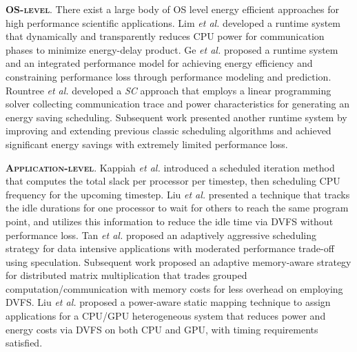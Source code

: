 \documentclass[12pt]{elsarticle}
\begin{document}
\vspace{1mm}
\noindent\textsc{\textbf{OS-level}}. There exist a large body of OS level energy efficient approaches for high performance scientific applications. Lim \textit{et al.} \cite{sc06} developed a runtime system that dynamically and transparently reduces CPU power for communication phases to minimize energy-delay product. Ge \textit{et al.} \cite{icpp07} proposed a runtime system and an integrated performance model for achieving energy efficiency and constraining performance loss through performance modeling and prediction. Rountree \textit{et al.} \cite{sc07} developed a \emph{SC} approach that employs a linear programming solver collecting communication trace and power characteristics for generating an energy saving scheduling. Subsequent work \cite{ics09} presented another runtime system by improving and extending previous classic scheduling algorithms and achieved significant energy savings with extremely limited performance loss.

\vspace{1mm}
\noindent\textsc{\textbf{Application-level}}. Kappiah \textit{et al.} \cite{sc05b} introduced a scheduled iteration method that computes the total slack per processor per timestep, then scheduling CPU frequency for the upcoming timestep. Liu \textit{et al.} \cite{ipdps05b} presented a technique that tracks the idle durations for one processor to wait for others to reach the same program point, and utilizes this information to reduce the idle time via DVFS without performance loss. Tan \textit{et al.} \cite{ipccc13} proposed an adaptively aggressive scheduling strategy for data intensive applications with moderated performance trade-off using speculation. Subsequent work \cite{iccs14} proposed an adaptive memory-aware strategy for distributed matrix multiplication that trades grouped computation/communication with memory costs for less overhead on employing DVFS. Liu \textit{et al.} \cite{pact12} proposed a power-aware static mapping technique to assign applications for a CPU/GPU heterogeneous system that reduces power and energy costs via DVFS on both CPU and GPU, with timing requirements satisfied.
\end{document}
